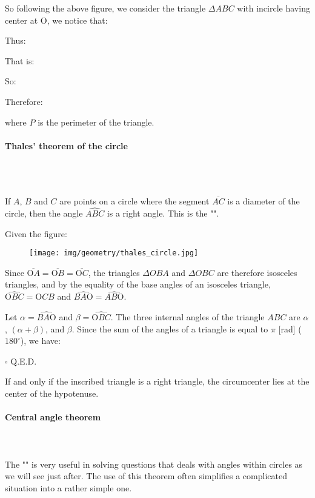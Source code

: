 	So following the above figure, we consider the triangle $\Delta ABC$ with incircle having center at O, we notice that:
	
	Thus:
	
	That is:
	
	So:
	
	Therefore:
	
	where $P$ is the perimeter of the triangle.
	
	\pagebreak
	\paragraph{Thales' theorem of the circle}\mbox{}\\\\
	\begin{theorem}
	If $A$, $B$ and $C$ are points on a circle where the segment $\overline{AC}$ is a diameter of the circle, then the angle $\widehat{ABC}$ is a right angle. This is the "".
	\end{theorem}
	\begin{dem}
	Given the figure:
	\begin{figure}[H]
		\centering
		\texttt{[image: img/geometry/thales\_circle.jpg]}
	\end{figure}	
	Since $\overline{\text{O}A} = \overline{\text{O}B} = \overline{\text{O}C}$, the triangles $\Delta OBA$ and $\Delta OBC$ are therefore isosceles triangles, and by the equality of the base angles of an isosceles triangle, $\widehat{\text{O}BC} = \widehat{\text{O}CB}$ and $\widehat{BA\text{O}} = \widehat{AB\text{O}}$.

	Let $\alpha = \widehat{BA\text{O}}$ and $\beta = \widehat{\text{O}BC}$. The three internal angles of the  triangle $ABC$ are $\alpha$, $(\alpha + \beta)$, and $\beta$. Since the sum of the angles of a triangle is equal to $\pi$ [rad] ($180^\circ$), we have:
	
	\begin{flushright}
		$\square$  Q.E.D.
	\end{flushright}
	\end{dem}
	\begin{corollary}
	If and only if the inscribed triangle is a right triangle, the circumcenter lies at the center of the hypotenuse.
	\end{corollary}
	
	\pagebreak
	\paragraph{Central angle theorem}\mbox{}\\\\
	The "" is very useful in solving questions that deals with angles within circles as we will see just after. The use of this theorem often simplifies a complicated situation into a rather simple one.
	
